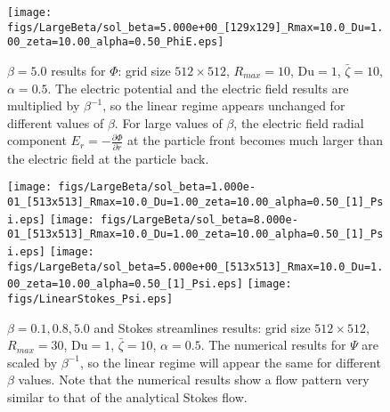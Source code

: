 \documentclass[MSc,beforeExam]{iitcsthesis}
\newcommand{\deriv}[2]{\frac{\partial #1}{\partial #2}}
\newcommand\Du{\text{Du}}
\begin{document}
\begin{figure}
    \begin{center}
    \texttt{[image: figs/LargeBeta/sol\_beta=5.000e+00\_[129x129]\_Rmax=10.0\_Du=1.00\_zeta=10.00\_alpha=0.50\_PhiE.eps]}
        \caption[$\beta = 5.0$ results for $\varPhi$]
        {$\beta = 5.0$ results for $\varPhi$:
        grid size $512 \times 512$, $R_{max} = 10$, $\Du = 1$, $\bar\zeta = 10$, $\alpha = 0.5$.
        The electric potential and the electric field results are multiplied by $\beta^{-1}$,
	    so the linear regime appears unchanged for different values of $\beta$.
	    For large values of $\beta$, the electric field radial component $E_r = -\deriv{\varPhi}{r}$
	    at the particle front becomes much larger than the electric field at the particle back.
		}
	    \label{fig:LargeBeta_Phi3}
    \end{center}
\end{figure}

\begin{figure}
    \begin{center}
    \texttt{[image: figs/LargeBeta/sol\_beta=1.000e-01\_[513x513]\_Rmax=10.0\_Du=1.00\_zeta=10.00\_alpha=0.50\_[1]\_Psi.eps]}
    \texttt{[image: figs/LargeBeta/sol\_beta=8.000e-01\_[513x513]\_Rmax=10.0\_Du=1.00\_zeta=10.00\_alpha=0.50\_[1]\_Psi.eps]}
    \texttt{[image: figs/LargeBeta/sol\_beta=5.000e+00\_[513x513]\_Rmax=10.0\_Du=1.00\_zeta=10.00\_alpha=0.50\_[1]\_Psi.eps]}
    \texttt{[image: figs/LinearStokes\_Psi.eps]}
        \caption[Streamfunction results]
        {$\beta = 0.1, 0.8, 5.0$ and Stokes streamlines results: grid size $512 \times 512$, 
        $R_{max} = 30$, $\Du = 1$, $\bar\zeta = 10$, $\alpha = 0.5$.
        The numerical results for $\Psi$ are scaled by $\beta^{-1}$, so the linear regime
        will appear the same for different $\beta$ values.
        Note that the numerical results show a
        flow pattern very similar to that of the analytical Stokes flow.}
	    \label{fig:LargeBeta_Psi}	    
    \end{center}
\end{figure}
\end{document}
